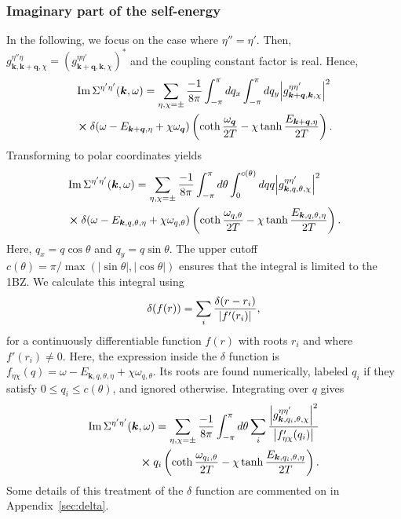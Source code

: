 \documentclass[aps, prb, twocolumn,amsmath,amssymb,floatfix]{revtex4-2}
\begin{document}
\subsubsection{Imaginary part of the self-energy}
In the following, we focus on the case where $\eta'' = \eta'$. Then, $ g_{\boldsymbol{k}, \boldsymbol{k}+\boldsymbol{q}, \chi}^{\eta''\eta} = (g_{\boldsymbol{k}+\boldsymbol{q}, \boldsymbol{k}, \chi}^{\eta\eta'})^*$ and the coupling constant factor is real.
Hence,
\begin{align}
\label{eq:imsigmaFM}
    &\Im\Sigma^{\eta'\eta'}(\boldsymbol{k}, \omega) =  \sum_{\eta, \chi = \pm} \frac{-1}{8\pi}\int_{-\pi}^{\pi} dq_x \int_{-\pi}^{\pi} dq_y \abs{g_{\boldsymbol{k}+\boldsymbol{q}, \boldsymbol{k}, \chi}^{\eta\eta'}}^2 \nonumber \\
    & \cross \delta(\omega-E_{\boldsymbol{k}+\boldsymbol{q},\eta}+\chi\omega_{\boldsymbol{q}}) \left(\coth\frac{\omega_{\boldsymbol{q}}}{2T}-\chi\tanh\frac{E_{\boldsymbol{k}+\boldsymbol{q},\eta}}{2T}\right).
\end{align}
Transforming to polar coordinates yields
\begin{align}
    &\Im\Sigma^{\eta'\eta'}(\boldsymbol{k}, \omega) = \sum_{\eta, \chi = \pm}\frac{-1}{8\pi}\int_{-\pi}^\pi d\theta \int_0^{c(\theta)} dq q \abs{g_{\boldsymbol{k}, q, \theta, \chi}^{\eta\eta'}}^2  \nonumber\\
    &\cross \delta(\omega-E_{\boldsymbol{k},q, \theta, \eta}+\chi \omega_{q,\theta}) \left(\coth\frac{\omega_{q,\theta}}{2T}-\chi \tanh\frac{E_{\boldsymbol{k},q, \theta, \eta}}{2T}\right).
\end{align}
Here, $q_x = q\cos\theta$ and $q_y = q\sin\theta$. The upper cutoff $c(\theta) = \pi/\operatorname{max}(|\sin\theta|,|\cos\theta|)$ ensures that the integral is limited to the 1BZ.
We calculate this integral using \cite{integraldelta}
\begin{equation}
    \delta(f(r)) = \sum_i \frac{\delta(r-r_i)}{\abs{f'(r_i)}},
\end{equation}
for a continuously differentiable function $f(r)$ with roots $r_i$ and where $f'(r_i) \neq 0$. Here, the expression inside the $\delta$ function is $f_{\eta\chi}(q) = \omega-E_{\boldsymbol{k},q, \theta, \eta}+\chi \omega_{q,\theta}$. Its roots are found numerically, labeled $q_i$ if they satisfy $ 0 \leq q_i \leq c(\theta)$, and ignored otherwise.
Integrating over $q$ gives
\begin{align}
\label{eq:numericimsigma}
    \Im\Sigma^{\eta'\eta'}(\boldsymbol{k}&, \omega) = \sum_{\eta, \chi = \pm}\frac{-1}{8\pi}\int_{-\pi}^\pi d\theta  \sum_{i} \frac{\abs{g_{\boldsymbol{k}, q_i, \theta, \chi}^{\eta\eta'}}^2 }{\abs{f_{\eta\chi}'(q_i)}} \nonumber \\
    &\cross q_i\left(\coth\frac{\omega_{q_i,\theta}}{2T}-\chi \tanh\frac{E_{\boldsymbol{k},q_i, \theta, \eta}}{2T}\right).
\end{align}
Some details of this treatment of the $\delta$ function are commented on in Appendix~\ref{sec:delta}.
\end{document}
